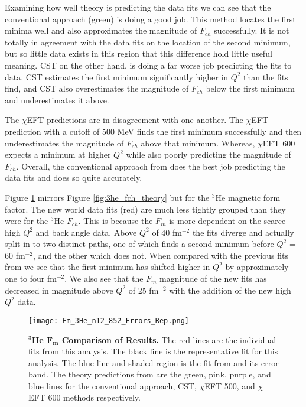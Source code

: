 Examining how well theory is predicting the data fits we can see that the conventional approach (green) is doing a good job. This method locates the first minima well and also approximates the magnitude of $F_{ch}$ successfully. It is not totally in agreement with the data fits on the location of the second minimum, but so little data exists in this region that this difference hold little useful meaning. CST on the other hand, is doing a far worse job predicting the fits to data. CST estimates the first minimum significantly higher in $Q^2$ than the fits find, and CST also overestimates the magnitude of $F_{ch}$ below the first minimum and underestimates it above. 

The $\chi$EFT predictions are in disagreement with one another. The $\chi$EFT prediction with a cutoff of 500 MeV finds the first minimum successfully and then underestimates the magnitude of $F_{ch}$ above that minimum. Whereas, $\chi$EFT 600 expects a minimum at higher $Q^2$ while also poorly predicting the magnitude of $F_{ch}$. Overall, the conventional approach from \cite{Article:Marcucci} does the best job predicting the data fits and does so quite accurately. 

Figure \ref{fig:3he_fm_theory} mirrors Figure \ref{fig:3he_fch_theory} but for the $^3$He magnetic form factor. The new world data fits (red) are much less tightly grouped than they were for the $^3$He $F_{ch}$. This is because the $F_m$ is more dependent on the scarce high $Q^2$ and back angle data. Above $Q^2$ of 40 fm$^{-2}$ the fits diverge and actually split in to two distinct paths, one of which finds a second minimum before $Q^2$ = 60 fm$^{-2}$, and the other which does not. When compared with the previous fits from \cite{Article:Amroun} we see that the first minimum has shifted higher in $Q^2$ by approximately one to four fm$^{-2}$. We also see that the $F_m$ magnitude of the new fits has decreased in magnitude above $Q^2$ of 25 fm$^{-2}$ with the addition of the new high $Q^2$ data.

\begin{figure}[!ht]
	\begin{center}
	\texttt{[image: Fm\_3He\_n12\_852\_Errors\_Rep.png]}
	\end{center}
	\caption[$^3$He $F_m$ Comparison of Results]{
	{\bf{$^3$He $\boldsymbol{F_m}$ Comparison of Results.}} The red lines are the individual fits from this analysis. The black line is the representative fit for this analysis. The blue line and shaded region is the fit from \cite{Article:Amroun} and its error band. The theory predictions from \cite{Article:Marcucci} are the green, pink, purple, and blue lines for the conventional approach, CST, $\chi$EFT 500, and $\chi$EFT 600 methods respectively.}
	\label{fig:3he_fm_theory}
\end{figure}

